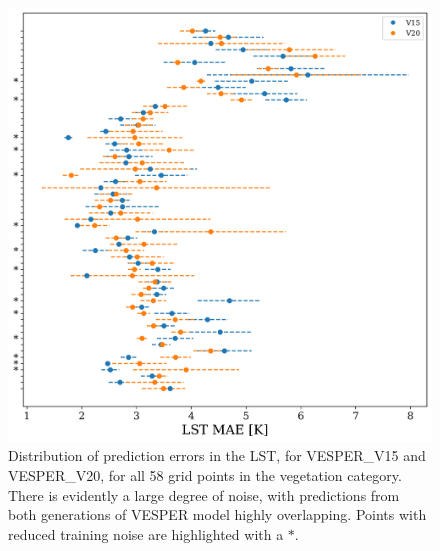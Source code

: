 \documentclass[hess, twostagejnl]{copernicus}
\begin{document}
\begin{figure}
	\includegraphics[width=\columnwidth]{veg_plot_noise}
	\caption{Distribution of prediction errors in the LST, for VESPER\_V15 and VESPER\_V20, for all 58 grid points in the vegetation category. There is evidently a large degree of noise, with predictions from both generations of VESPER model highly overlapping. Points with reduced training noise are highlighted with a $*$.}
	\label{fig:veg-noise}
\end{figure}
\end{document}
